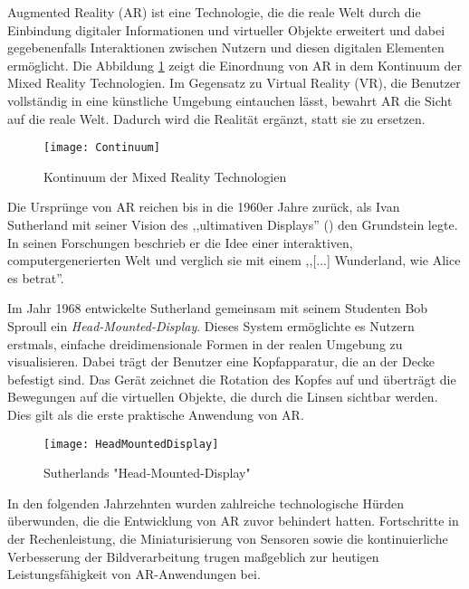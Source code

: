 Augmented Reality (AR) ist eine Technologie, die die reale Welt durch die Einbindung digitaler Informationen und virtueller Objekte erweitert und dabei gegebenenfalls Interaktionen zwischen Nutzern und diesen digitalen Elementen ermöglicht. Die Abbildung \ref{fig:Continuum} zeigt die Einordnung von AR in dem Kontinuum der Mixed Reality Technologien. Im Gegensatz zu Virtual Reality (VR), die Benutzer vollständig in eine künstliche Umgebung eintauchen lässt, bewahrt AR die Sicht auf die reale Welt. Dadurch wird die Realität ergänzt, statt sie zu ersetzen. \cite{azuma1997ar, doerner2022virtual}

\begin{figure}
    \centering
    \texttt{[image: Continuum]}
    \caption{Kontinuum der Mixed Reality Technologien\label{fig:Continuum}}\par
\end{figure}

Die Ursprünge von AR reichen bis in die 1960er Jahre zurück, als Ivan Sutherland mit seiner Vision des ,,ultimativen Displays'' (\citet{sutherland1965ultimateDisplay}) den Grundstein legte. In seinen Forschungen beschrieb er die Idee einer interaktiven, computergenerierten Welt und verglich sie mit einem ,,[...] Wunderland, wie Alice es betrat''. 

Im Jahr 1968 entwickelte Sutherland gemeinsam mit seinem Studenten Bob Sproull ein \textit{Head-Mounted-Display}. Dieses System ermöglichte es Nutzern erstmals, einfache dreidimensionale Formen in der realen Umgebung zu visualisieren. Dabei trägt der Benutzer eine Kopfapparatur, die an der Decke befestigt sind. Das Gerät zeichnet die Rotation des Kopfes auf und überträgt die Bewegungen auf die virtuellen Objekte, die durch die Linsen sichtbar werden. Dies gilt als die erste praktische Anwendung von AR. \cite{sutherland19683dDisplay, doerner2022virtual}

\begin{figure}
    \centering
    \texttt{[image: HeadMountedDisplay]}
    \caption{Sutherlands "Head-Mounted-Display" \cite{sutherland1965ultimateDisplay}\label{fig:HeadMountedDisplay}}\par
\end{figure}

In den folgenden Jahrzehnten wurden zahlreiche technologische Hürden überwunden, die die Entwicklung von AR zuvor behindert hatten. Fortschritte in der Rechenleistung, die Miniaturisierung von Sensoren sowie die kontinuierliche Verbesserung der Bildverarbeitung trugen maßgeblich zur heutigen Leistungsfähigkeit von AR-Anwendungen bei. \cite{doerner2022virtual}


